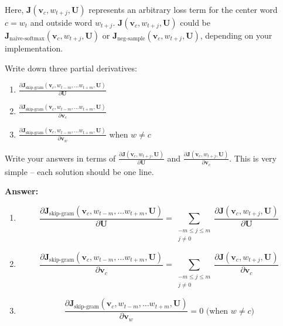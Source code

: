 \documentclass{article}
\newenvironment{answer}{
    {\bf Answer:} \sf \begingroup\color{red}
}{\endgroup}%
\begin{document}
\begin{enumerate}[label=(\alph*)]
Here, $\bm J(\bm v_c, w_{t+j}, \bm U)$ represents an arbitrary loss term for the center word $c=w_t$ and outside word $w_{t+j}$. $\bm J(\bm v_c, w_{t+j}, \bm U)$ could be $\bm J_{\text{naive-softmax}}(\bm v_c, w_{t+j}, \bm U)$ or $\bm J_{\text{neg-sample}}(\bm v_c, w_{t+j}, \bm U)$, depending on your implementation.

Write down three partial derivatives: 
\begin{enumerate}[label=(\roman*)]
    \item ${\frac{\partial \bm J_{\textrm{skip-gram}}(\bm v_c, w_{t-m},\ldots w_{t+m}, \bm U)} {\partial \bm U}}$
    \item ${\frac{\partial \bm J_{\textrm{skip-gram}}(\bm v_c, w_{t-m},\ldots w_{t+m}, \bm U)} {\partial \bm v_c}}$
    \item ${\frac{\partial \bm J_{\textrm{skip-gram}}(\bm v_c, w_{t-m},\ldots w_{t+m}, \bm U)} {\partial \bm v_w}}$ when $w \ne c$
\end{enumerate}
Write your answers in terms of ${\frac{\partial \bm J(\bm v_c, w_{t+j}, \bm U)}{\partial \bm U}}$ and ${\frac{\partial \bm J(\bm v_c, w_{t+j}, \bm U)}{\partial \bm v_c}}$. This is very simple -- each solution should be one line.

\begin{shaded}
\begin{answer}

\begin{enumerate}[label=(\roman*)]
    \item 
        \begin{equation*}
            {\frac{\partial \bm J_{\textrm{skip-gram}}(\bm v_c, w_{t-m},\ldots w_{t+m}, \bm U)} {\partial \bm U}}
            = \sum_{\substack{-m\le j \le m \\ j\ne 0}} {\frac{\partial \bm J(\bm v_c, w_{t+j}, \bm U)}{\partial \bm U}}
        \end{equation*}
    \item
        \begin{equation*}
            {\frac{\partial \bm J_{\textrm{skip-gram}}(\bm v_c, w_{t-m},\ldots w_{t+m}, \bm U)} {\partial \bm v_c}}
            = \sum_{\substack{-m\le j \le m \\ j\ne 0}} {\frac{\partial \bm J(\bm v_c, w_{t+j}, \bm U)}{\partial \bm v_c}}
        \end{equation*}
    \item
        \begin{equation*}
            {\frac{\partial \bm J_{\textrm{skip-gram}}(\bm v_c, w_{t-m},\ldots w_{t+m}, \bm U)} {\partial \bm v_w}}
            = 0 \text{ (when $w \ne c$)}
        \end{equation*}
\end{enumerate}


\end{answer}
\end{shaded}
\end{enumerate}
\end{document}
